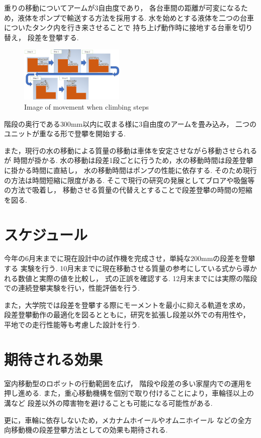 \documentclass[dvipdfmx]{jsarticle}
\begin{document}
重りの移動についてアームが3自由度であり，
各台車間の距離が可変になるため，液体をポンプで輸送する方法を採用する.
水を始めとする液体を二つの台車についたタンク内を行き来させることで
持ち上げ動作時に接地する台車を切り替え，
段差を登攀する.
\begin{figure}[H]
\centering
\includegraphics[width=50mm]{image/flow}
\caption{Image of movement when climbing steps}
\label{fig:model02}
\end{figure}

階段の奥行である$300\mathrm{mm}$以内に収まる様に3自由度のアームを畳み込み，
二つのユニットが重なる形で登攀を開始する.

また，現行の水の移動による質量の移動は車体を安定させながら移動させられるが
時間が掛かる.
水の移動は段差1段ごとに行うため，水の移動時間は段差登攀に掛かる時間に直結し，
水の移動時間はポンプの性能に依存する.
そのため現行の方法は時間短縮に限度がある.
そこで現行の研究の発展としてブロアや吸盤等の方法で吸着し，
移動させる質量の代替えとすることで段差登攀の時間の短縮を図る.

\section{スケジュール}
今年の6月末までに現在設計中の試作機を完成させ，単純な$200\mathrm{mm}$の段差を登攀する
実験を行う.
10月末までに現在移動させる質量の参考にしている式から導かれる数値と実際の値を比較し，
式の正誤を確認する.
12月末までには実際の階段での連続登攀実験を行い，性能評価を行う.

また，大学院では段差を登攀する際にモーメントを最小に抑える軌道を求め，
段差登攀動作の最適化を図るとともに，研究を拡張し段差以外での有用性や，
平地での走行性能等も考慮した設計を行う.

\section{期待される効果}
室内移動型のロボットの行動範囲を広げ，
階段や段差の多い家屋内での運用を押し進める.
また，重心移動機構を個別で取り付けることにより，車輪径以上の溝など
段差以外の障害物を避けることも可能になる可能性がある.

更に，車輪に依存しないため，メカナムホイールやオムニホイール
などの全方向移動機の段差登攀方法としての効果も期待される.
\end{document}
